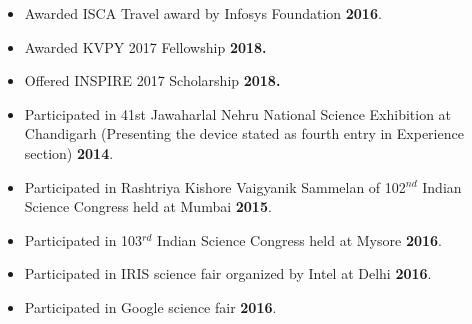 \begin{itemize}
    \item  Awarded ISCA Travel award by Infosys Foundation  \textbf{2016}.

\item Awarded KVPY 2017 Fellowship \textbf{2018.} 

\item Offered INSPIRE 2017 Scholarship  \textbf{2018.}

\item Participated in 41st Jawaharlal Nehru National Science Exhibition at Chandigarh (Presenting the device  stated as fourth entry in Experience section) \textbf{2014}.  

\item  Participated in Rashtriya Kishore Vaigyanik Sammelan of 102$^{nd}$ Indian Science Congress held at Mumbai \textbf{2015}.

\item  Participated in 103$^{rd}$ Indian Science Congress held at Mysore \textbf{2016}. 

\item Participated in IRIS science fair organized by Intel at Delhi  \textbf{2016}. 

\item Participated in Google science fair  \textbf{2016}.


\end{itemize}